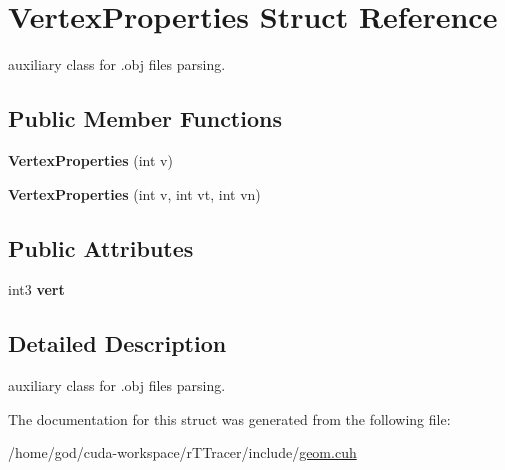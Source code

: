 \hypertarget{struct_vertex_properties}{}\section{Vertex\+Properties Struct Reference}
\label{struct_vertex_properties}


auxiliary class for .obj files parsing.  


\subsection*{Public Member Functions}
\begin{DoxyCompactItemize}
\item 
{\bfseries Vertex\+Properties} (int v)\hypertarget{struct_vertex_properties_addd3e65fd4731113b8d2912a5ae62c1e}{}\label{struct_vertex_properties_addd3e65fd4731113b8d2912a5ae62c1e}

\item 
{\bfseries Vertex\+Properties} (int v, int vt, int vn)\hypertarget{struct_vertex_properties_ad6e681f2c6ef779436db3349b8a2a06e}{}\label{struct_vertex_properties_ad6e681f2c6ef779436db3349b8a2a06e}

\end{DoxyCompactItemize}
\subsection*{Public Attributes}
\begin{DoxyCompactItemize}
\item 
int3 {\bfseries vert}\hypertarget{struct_vertex_properties_aaad2a462f8f48c85a08f6891a6d974fa}{}\label{struct_vertex_properties_aaad2a462f8f48c85a08f6891a6d974fa}

\end{DoxyCompactItemize}


\subsection{Detailed Description}
auxiliary class for .obj files parsing. 

The documentation for this struct was generated from the following file\+:\begin{DoxyCompactItemize}
\item 
/home/god/cuda-\/workspace/r\+T\+Tracer/include/\hyperlink{geom_8cuh}{geom.\+cuh}\end{DoxyCompactItemize}
